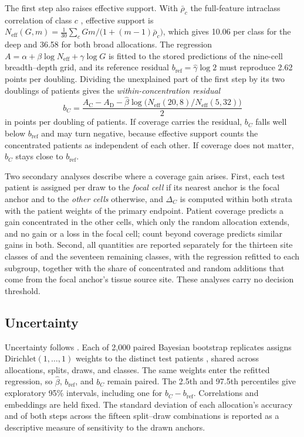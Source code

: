 \documentclass[11pt]{article}
\newcommand{\Neff}{N_{\mathrm{eff}}}
\begin{document}
The first step also raises effective support. With $\bar\rho_c$ the full-feature intraclass correlation of class $c$ \citep{queisler2026multidirectionalRedundancy}, effective support is $\Neff(G,m)=\frac{1}{30}\sum_{c}Gm/\bigl(1+(m-1)\bar\rho_c\bigr)$, which gives 10.06 per class for the deep and 36.58 for both broad allocations. The regression $A=\alpha+\beta\log\Neff+\gamma\log G$ is fitted to the stored predictions of the nine-cell breadth--depth grid, and its reference residual $b_{\mathrm{ref}}=\hat\gamma\log 2$ must reproduce 2.62 points per doubling. Dividing the unexplained part of the first step by its two doublings of patients gives the \emph{within-concentration residual}
\begin{equation}
 b_C=\frac{A_{\mathrm C}-A_{\mathrm D}-\hat\beta\log\bigl(\Neff(20,8)/\Neff(5,32)\bigr)}{2}
 \label{eq:within-concentration}
\end{equation}
\noindent in points per doubling of patients. If coverage carries the residual, $b_C$ falls well below $b_{\mathrm{ref}}$ and may turn negative, because effective support counts the concentrated patients as independent of each other. If coverage does not matter, $b_C$ stays close to $b_{\mathrm{ref}}$.

Two secondary analyses describe where a coverage gain arises. First, each test patient is assigned per draw to the \emph{focal cell} if its nearest anchor is the focal anchor and to the \emph{other cells} otherwise, and $\Delta_C$ is computed within both strata with the patient weights of the primary endpoint. Patient coverage predicts a gain concentrated in the other cells, which only the random allocation extends, and no gain or a loss in the focal cell; count beyond coverage predicts similar gains in both. Second, all quantities are reported separately for the thirteen site classes of \citet{queisler2026siteCoverage} and the seventeen remaining classes, with the regression refitted to each subgroup, together with the share of concentrated and random additions that come from the focal anchor's tissue source site. These analyses carry no decision threshold.

\subsection{Uncertainty}
\label{sec:uncertainty}
Uncertainty follows \citet{queisler2026effectiveSupport}. Each of 2,000 paired Bayesian bootstrap replicates assigns $\mathrm{Dirichlet}(1,\ldots,1)$ weights to the distinct test patients \citep{rubin1981bayesian}, shared across allocations, splits, draws, and classes. The same weights enter the refitted regression, so $\hat\beta$, $b_{\mathrm{ref}}$, and $b_C$ remain paired. The 2.5th and 97.5th percentiles give exploratory 95\% intervals, including one for $b_C-b_{\mathrm{ref}}$. Correlations and embeddings are held fixed. The standard deviation of each allocation's accuracy and of both steps across the fifteen split--draw combinations is reported as a descriptive measure of sensitivity to the drawn anchors.
\end{document}
